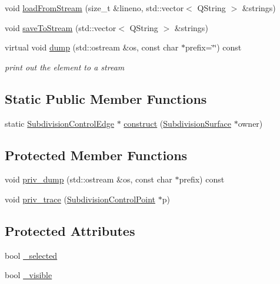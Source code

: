 \begin{DoxyCompactItemize}
\item 
void \hyperlink{classShipCAD_1_1SubdivisionControlEdge_a7c6098254d4a92c44d01c3e247b29782}{load\-From\-Stream} (size\-\_\-t \&lineno, std\-::vector$<$ Q\-String $>$ \&strings)
\item 
void \hyperlink{classShipCAD_1_1SubdivisionControlEdge_a21c0e8b4d4cd138ddd0bbcc707775040}{save\-To\-Stream} (std\-::vector$<$ Q\-String $>$ \&strings)
\item 
virtual void \hyperlink{classShipCAD_1_1SubdivisionControlEdge_abdfa96ff05eff404214a92d38d7eb715}{dump} (std\-::ostream \&os, const char $\ast$prefix=\char`\"{}\char`\"{}) const 
\begin{DoxyCompactList}\small\item\em print out the element to a stream \end{DoxyCompactList}\end{DoxyCompactItemize}
\subsection*{Static Public Member Functions}
\begin{DoxyCompactItemize}
\item 
static \hyperlink{classShipCAD_1_1SubdivisionControlEdge}{Subdivision\-Control\-Edge} $\ast$ \hyperlink{classShipCAD_1_1SubdivisionControlEdge_a20fc507b201766b6e3d0560595946fac}{construct} (\hyperlink{classShipCAD_1_1SubdivisionSurface}{Subdivision\-Surface} $\ast$owner)
\end{DoxyCompactItemize}
\subsection*{Protected Member Functions}
\begin{DoxyCompactItemize}
\item 
void \hyperlink{classShipCAD_1_1SubdivisionControlEdge_acc4cee57db50beb1dcc6361f7f2c62af}{priv\-\_\-dump} (std\-::ostream \&os, const char $\ast$prefix) const 
\item 
void \hyperlink{classShipCAD_1_1SubdivisionControlEdge_aec6ff8caa6996ae5a9d2e58d5d2b0344}{priv\-\_\-trace} (\hyperlink{classShipCAD_1_1SubdivisionControlPoint}{Subdivision\-Control\-Point} $\ast$p)
\end{DoxyCompactItemize}
\subsection*{Protected Attributes}
\begin{DoxyCompactItemize}
\item 
bool \hyperlink{classShipCAD_1_1SubdivisionControlEdge_a8e67d30ef7ef87ff599f73b59c806f58}{\-\_\-selected}
\item 
bool \hyperlink{classShipCAD_1_1SubdivisionControlEdge_a8d49343e2b6ff0ab13653849af242740}{\-\_\-visible}
\end{DoxyCompactItemize}
